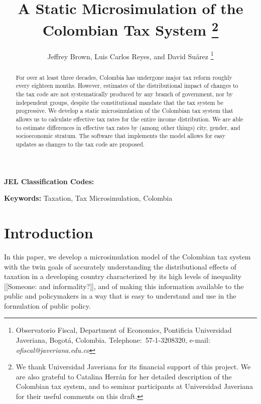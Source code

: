 \documentclass[12pt]{article}
\begin{document}
\title{A Static Microsimulation of the Colombian Tax System
  \thanks{We thank Universidad Javeriana for its financial support of this project.
    We are also grateful to Catalina Herr\'{a}n for her detailed description of the Colombian tax system,
    and to seminar participants at Universidad Javeriana for their useful comments on this draft.}}
\author{Jeffrey Brown, Luis Carlos Reyes, and David Su\'{a}rez
  \thanks{Observatorio Fiscal,
    Department of Economics, Pontificia Universidad Javeriana, Bogot\'{a}, Colombia.
    Telephone:\ 57-1-3208320,
    e-mail: \textit{ofiscal@javeriana.edu.co}}}

\maketitle
\begin{abstract}
  For over at least three decades,
  Colombia has undergone major tax reform roughly every eighteen months.
  However, estimates of the distributional impact of changes to the tax code are not systematically produced by any branch of government,
  nor by independent groups,
  despite the constitutional mandate that the tax system be progressive.
  We develop a static microsimulation of the Colombian tax system
  that allows us to calculate effective tax rates
  for the entire income distribution.
  We are able to estimate differences in effective tax rates by
  (among other things) city, gender, and socioeconomic stratum.
  The software that implements the model allows for
  easy updates as changes to the tax code are proposed.
 \end{abstract}

\textbf{JEL Classification Codes:}

\textbf{Keywords:} Taxation, Tax Microsimulation, Colombia
\pagebreak%
\doublespacing

\section{Introduction}

In this paper, we develop a microsimulation model of the Colombian tax system
with the twin goals of
accurately understanding the distributional effects of taxation
in a developing country characterized by its high levels of inequality
[[Someone:
    and informality?]],
and of making this information available to the public and policymakers
in a way that is easy to understand and use in the formulation of public policy.
\end{document}
